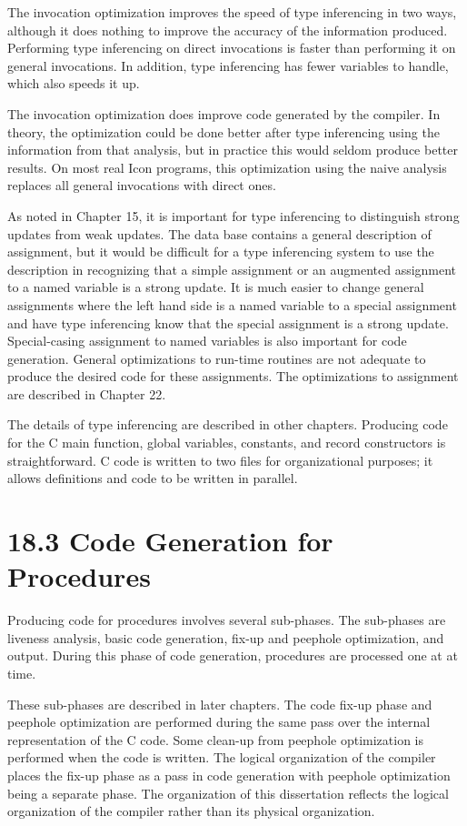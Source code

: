 The invocation optimization improves the speed of type inferencing in
two ways, although it does nothing to improve the accuracy of the
information produced. Performing type inferencing on direct
invocations is faster than performing it on general invocations. In
addition, type inferencing has fewer variables to handle, which also
speeds it up.

The invocation optimization does improve code generated by the
compiler. In theory, the optimization could be done better after type
inferencing using the information from that analysis, but in practice
this would seldom produce better results. On most real Icon programs,
this optimization using the naive analysis replaces all general
invocations with direct ones.

As noted in Chapter 15, it is important for type inferencing to
distinguish strong updates from weak updates. The data base contains a
general description of assignment, but it would be difficult for a
type inferencing system to use the description in recognizing that a
simple assignment or an augmented assignment to a named variable is a
strong update.  It is much easier to change general assignments where
the left hand side is a named variable to a special assignment and
have type inferencing know that the special assignment is a strong
update. Special-casing assignment to named variables is also important
for code generation. General optimizations to run-time routines are
not adequate to produce the desired code for these assignments. The
optimizations to assignment are described in Chapter 22.

The details of type inferencing are described in other
chapters. Producing code for the C main function, global variables,
constants, and record constructors is straightforward. C code is
written to two files for organizational purposes; it allows
definitions and code to be written in parallel.


\section[18.3 Code Generation for Procedures]{18.3 Code Generation for Procedures}

Producing code for procedures involves several sub-phases. The
sub-phases are liveness analysis, basic code generation, fix-up and
peephole optimization, and output. During this phase of code
generation, procedures are processed one at at time.

These sub-phases are described in later chapters. The code fix-up
phase and peephole optimization are performed during the same pass
over the internal representation of the C code. Some clean-up from
peephole optimization is performed when the code is written. The
logical organization of the compiler places the fix-up phase as a pass
in code generation with peephole optimization being a separate
phase. The organization of this dissertation reflects the logical
organization of the compiler rather than its physical organization.

